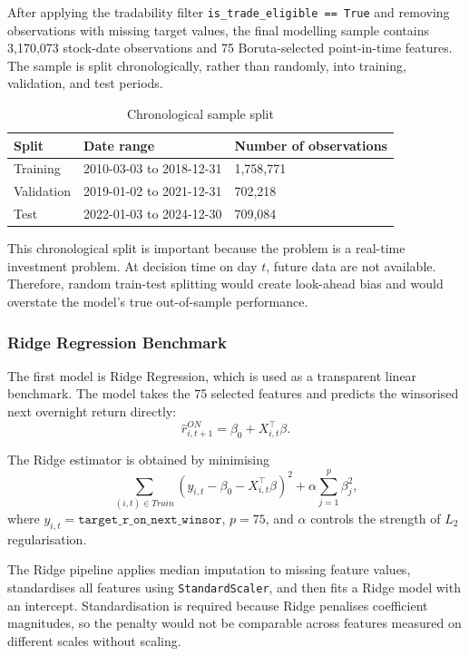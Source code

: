\documentclass[12pt]{article}
\begin{document}
After applying the tradability filter \texttt{is\_trade\_eligible == True} and removing observations with missing target values, the final modelling sample contains 3,170,073 stock-date observations and 75 Boruta-selected point-in-time features. The sample is split chronologically, rather than randomly, into training, validation, and test periods.

\begin{table}[H]
\centering
\caption{Chronological sample split}
\begin{tabular}{lll}
\toprule
Split & Date range & Number of observations \\
\midrule
Training & 2010-03-03 to 2018-12-31 & 1,758,771 \\
Validation & 2019-01-02 to 2021-12-31 & 702,218 \\
Test & 2022-01-03 to 2024-12-30 & 709,084 \\
\bottomrule
\end{tabular}
\end{table}

This chronological split is important because the problem is a real-time investment problem. At decision time on day $t$, future data are not available. Therefore, random train-test splitting would create look-ahead bias and would overstate the model's true out-of-sample performance.

\subsubsection{Ridge Regression Benchmark}

The first model is Ridge Regression, which is used as a transparent linear benchmark. The model takes the 75 selected features and predicts the winsorised next overnight return directly:
\[
\hat{r}^{ON}_{i,t+1}
=
\beta_0 + X_{i,t}^{\top}\beta.
\]

The Ridge estimator is obtained by minimising
\[
\sum_{(i,t)\in Train}
\left(
y_{i,t} - \beta_0 - X_{i,t}^{\top}\beta
\right)^2
+
\alpha \sum_{j=1}^{p}\beta_j^2,
\]
where $y_{i,t}=\texttt{target\_r\_on\_next\_winsor}$, $p=75$, and $\alpha$ controls the strength of $L_2$ regularisation.

The Ridge pipeline applies median imputation to missing feature values, standardises all features using \texttt{StandardScaler}, and then fits a Ridge model with an intercept. Standardisation is required because Ridge penalises coefficient magnitudes, so the penalty would not be comparable across features measured on different scales without scaling.
\end{document}

